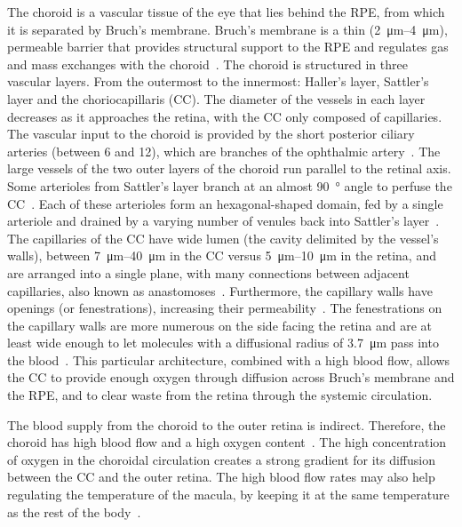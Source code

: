 \documentclass{article}
\begin{document}
The choroid is a vascular tissue of the eye that lies behind the RPE, from which it is separated by Bruch's membrane.
Bruch's membrane is a thin (\SIrange{2}{4}{\micro\meter}), permeable barrier that provides structural support to the RPE and regulates gas and mass exchanges with the choroid~\cite{Curcio_2013}.
The choroid is structured in three vascular layers.
From the outermost to the innermost: Haller's layer, Sattler's layer and the choriocapillaris (CC).
The diameter of the vessels in each layer decreases as it approaches the retina, with the CC only composed of capillaries.
The vascular input to the choroid is provided by the short posterior ciliary arteries (between 6 and 12), which are branches of the ophthalmic artery~\cite{Kiel_2010}.
The large vessels of the two outer layers of the choroid run parallel to the retinal axis.
Some arterioles from Sattler's layer branch at an almost \SI{90}{\degree} angle to perfuse the CC~\cite{Nickla_2010}.
Each of these arterioles form an hexagonal-shaped domain, fed by a single arteriole and drained by a varying number of venules back into Sattler's layer~\cite{Zouache_2016}.
The capillaries of the CC have wide lumen (the cavity delimited by the vessel's walls), between \SIrange{7}{40}{\micro\meter} in the CC versus \SIrange{5}{10}{\micro\meter} in the retina, and are arranged into a single plane, with many connections between adjacent capillaries, also known as anastomoses~\cite{Bill_1983, ChanLing_2011,Fryczkowski_1994}.
Furthermore, the capillary walls have openings (or fenestrations), increasing their permeability~\cite{Nickla_2010}.
The fenestrations on the capillary walls are more numerous on the side facing the retina and are at least wide enough to let molecules with a diffusional radius of \SI{3.7}{\micro\meter} pass into the blood~\cite{Nickla_2010, Bill_1983}.
This particular architecture, combined with a high blood flow, allows the CC to provide enough oxygen through diffusion across Bruch's membrane and the RPE, and to clear waste from the retina through the systemic circulation.

The blood supply from the choroid to the outer retina is indirect.
Therefore, the choroid has high blood flow and a high oxygen content~\cite{Bill_1983}.
The high concentration of oxygen in the choroidal circulation creates a strong gradient for its diffusion between the CC and the outer retina.
The high blood flow rates may also help regulating the temperature of the macula, by keeping it at the same temperature as the rest of the body~\cite{Bill_1983, Parver_1991}.
\end{document}
